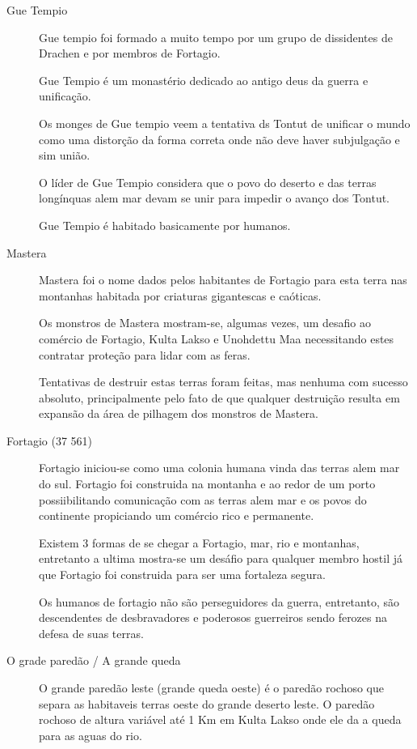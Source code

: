 \begin{description}
\item[Gue Tempio]
Gue tempio foi formado a muito tempo por um grupo de dissidentes de
Drachen e por membros de Fortagio.

Gue Tempio \'e um monast\'erio dedicado ao antigo deus da guerra
e unifica\c{c}\~ao.

Os monges de Gue tempio veem a tentativa ds Tontut de unificar o mundo
como uma distor\c{c}\~ao da forma correta onde n\~ao deve haver subjulga\c{c}\~ao
e sim uni\~ao.

O l\'ider de Gue Tempio considera que o povo do deserto e das terras long\'inquas
alem mar devam se unir para impedir o avan\c{c}o dos Tontut.

Gue Tempio \'e habitado basicamente por humanos.

\item[Mastera]
Mastera foi o nome dados pelos habitantes de Fortagio para esta terra
nas montanhas habitada por criaturas gigantescas e ca\'oticas.

Os monstros de Mastera mostram-se, algumas vezes, um desafio ao com\'ercio
de Fortagio, Kulta Lakso e Unohdettu Maa necessitando estes contratar prote\c{c}\~ao
para lidar com as feras.

Tentativas de destruir estas terras foram feitas, mas nenhuma com sucesso absoluto,
principalmente pelo fato de que qualquer destrui\c{c}\~ao resulta em expans\~ao da
\'area de pilhagem dos monstros de Mastera.

\item[Fortagio (37 561)]
Fortagio iniciou-se como uma colonia humana vinda das terras alem mar do sul.
Fortagio foi construida na montanha e ao redor de um porto possiibilitando
comunica\c{c}\~ao com as terras alem mar e os povos do continente propiciando
um com\'ercio rico e permanente.

Existem 3 formas de se chegar a Fortagio, mar, rio e montanhas, entretanto a
ultima mostra-se um des\'afio para qualquer membro hostil j\'a que Fortagio
foi construida para ser uma fortaleza segura.

Os humanos de fortagio n\~ao s\~ao perseguidores da guerra, entretanto,
s\~ao descendentes de desbravadores e poderosos guerreiros sendo
ferozes na defesa de suas terras.

\item[O grade pared\~ao / A grande queda]
O grande pared\~ao leste (grande queda oeste) \'e o pared\~ao rochoso que
separa as habitaveis terras oeste do grande deserto leste. O pared\~ao
rochoso de altura vari\'avel at\'e 1 Km em Kulta Lakso onde ele da a queda
para as aguas do rio.


\end{description}
